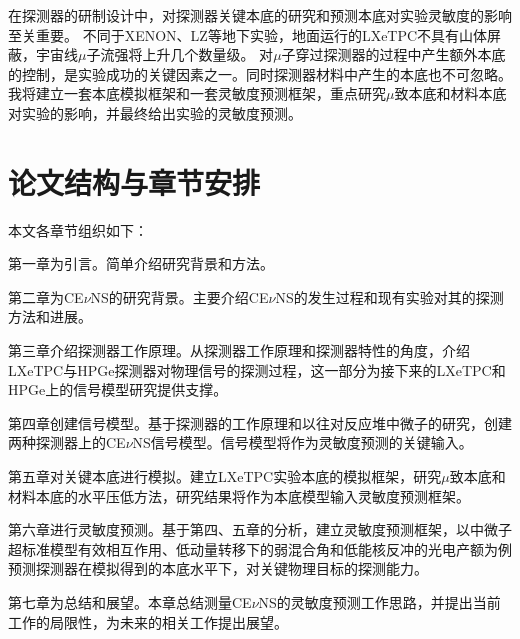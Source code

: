 在探测器的研制设计中，对探测器关键本底的研究和预测本底对实验灵敏度的影响至关重要。
不同于XENON、LZ等地下实验，地面运行的LXeTPC不具有山体屏蔽，宇宙线$\mu$子流强将上升几个数量级。
对$\mu$子穿过探测器的过程中产生额外本底的控制，是实验成功的关键因素之一。同时探测器材料中产生的本底也不可忽略。
我将建立一套本底模拟框架和一套灵敏度预测框架，重点研究$\mu$致本底和材料本底对实验的影响，并最终给出实验的灵敏度预测。

\section{论文结构与章节安排}

本文各章节组织如下：

第一章为引言。简单介绍研究背景和方法。

第二章为CE$\nu$NS的研究背景。主要介绍CE$\nu$NS的发生过程和现有实验对其的探测方法和进展。

第三章介绍探测器工作原理。从探测器工作原理和探测器特性的角度，介绍LXeTPC与HPGe探测器对物理信号的探测过程，这一部分为接下来的LXeTPC和HPGe上的信号模型研究提供支撑。

第四章创建信号模型。基于探测器的工作原理和以往对反应堆中微子的研究，创建两种探测器上的CE$\nu$NS信号模型。信号模型将作为灵敏度预测的关键输入。

第五章对关键本底进行模拟。建立LXeTPC实验本底的模拟框架，研究$\mu$致本底和材料本底的水平压低方法，研究结果将作为本底模型输入灵敏度预测框架。

第六章进行灵敏度预测。基于第四、五章的分析，建立灵敏度预测框架，以中微子超标准模型有效相互作用、低动量转移下的弱混合角和低能核反冲的光电产额为例预测探测器在模拟得到的本底水平下，对关键物理目标的探测能力。

第七章为总结和展望。本章总结测量CE$\nu$NS的灵敏度预测工作思路，并提出当前工作的局限性，为未来的相关工作提出展望。

